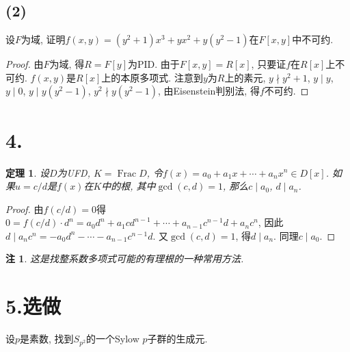 \documentclass[12pt, a4paper, fontset=windows]{ctexart}
\newcommand{\Frac}{\operatorname{Frac}}
\newcommand{\xuan}{{\normalsize 选做}}
\newtheorem*{remark}{注}
\newtheorem*{theorem}{定理}
\begin{document}
\subsection*{(2)}

设$F$为域, 证明$f(x,y)=(y^2+1)x^3+yx^2+y(y^2-1)$在$F[x,y]$中不可约. 

\begin{proof}
由$F$为域, 得$R=F[y]$为PID. 由于$F[x,y]=R[x]$, 只要证$f$在$R[x]$上不可约. 
$f(x,y)$是$R[x]$上的本原多项式. 注意到$y$为$R$上的素元, $y\nmid y^2+1$, $y\mid y$, $y\mid 0$, 
$y\mid y(y^2-1)$, $y^2\nmid y(y^2-1)$, 由Eisenstein判别法, 得$f$不可约. 
\end{proof}

\section*{4.}
\label{Q-root}

\begin{theorem}
设$D$为UFD, $K=\Frac D$, 令$f(x)=a_0+a_1x+\cdots+a_nx^n\in D[x]$. 
如果$u=c/d$是$f(x)$在$K$中的根, 其中$\gcd(c,d)=1$, 那么$c\mid a_0$, $d\mid a_n$. 
\end{theorem}

\begin{proof}
由$f(c/d)=0$得$0=f(c/d)\cdot d^n=a_0d^n+a_1cd^{n-1}+\cdots+a_{n-1}c^{n-1}d+a_nc^n$, 
因此$d\mid a_nc^n=-a_0d^n-\cdots-a_{n-1}c^{n-1}d$. 又$\gcd(c,d)=1$, 
得$d\mid a_n$. 同理$c\mid a_0$. 
\end{proof}

\begin{remark}
这是找整系数多项式可能的有理根的一种常用方法. 
\end{remark}

\section*{5.\xuan}
\label{Sp2-wr}

设$p$是素数, 找到$S_{p^2}$的一个Sylow $p$子群的生成元. 
\end{document}
